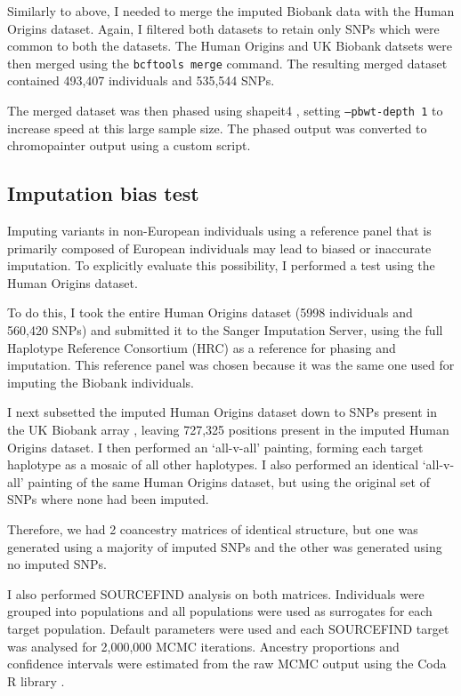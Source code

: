 Similarly to above, I needed to merge the imputed Biobank data with the Human Origins dataset. Again, I filtered both datasets to retain only SNPs which were common to both the datasets. The Human Origins and UK Biobank datsets were then merged using the \texttt{bcftools merge} command. The resulting merged dataset contained 493,407 individuals and 535,544 SNPs.

The merged dataset was then phased using shapeit4 \cite{delaneau2018integrative}, setting \texttt{--pbwt-depth 1} to increase speed at this large sample size. The phased output was converted to chromopainter output using a custom script.


\subsection{Imputation bias test}

Imputing variants in non-European individuals using a reference panel that is primarily composed of European individuals may lead to biased or inaccurate imputation. To explicitly evaluate this possibility, I performed a test using the Human Origins dataset.
 
To do this, I took the entire Human Origins dataset (5998 individuals and 560,420 SNPs) and submitted it to the Sanger Imputation Server, using the full Haplotype Reference Consortium (HRC) as a reference for phasing and imputation. This reference panel was chosen because it was the same one used for imputing the Biobank individuals.

I next subsetted the imputed Human Origins dataset down to SNPs present in the UK Biobank array , leaving 727,325 positions present in the imputed Human Origins dataset. I then performed an `all-v-all' painting, forming each target haplotype as a mosaic of all other haplotypes. I also performed an identical `all-v-all' painting of the same Human Origins dataset, but using the original set of SNPs where none had been imputed. 

Therefore, we had 2 coancestry matrices of identical structure, but one was generated using a majority of imputed SNPs and the other was generated using no imputed SNPs. 

I also performed SOURCEFIND analysis on both matrices. Individuals were grouped into populations and all populations were used as surrogates for each target population. Default parameters were used and each SOURCEFIND target was analysed for 2,000,000 MCMC iterations. Ancestry proportions and confidence intervals were estimated from the raw MCMC output using the Coda R library \cite{oro22547}.

